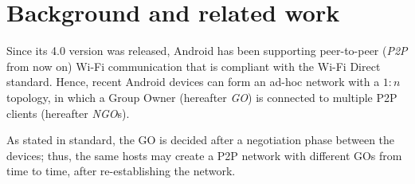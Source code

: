 \section{Background and related work} %
Since its 4.0 version was released, Android has been supporting peer-to-peer
(\textit{P2P} from now on) Wi-Fi communication that is compliant with the
Wi-Fi Direct standard\cite{bib:wifiP2pspec}.
Hence, recent Android devices can form an ad-hoc network with a $1:n$ topology,
in which a Group Owner (hereafter \textit{GO}) is connected to multiple P2P
clients (hereafter \textit{NGO}s).

As stated in standard, the GO is decided after a negotiation phase between the
devices; thus, the same hosts may create a P2P network with different GOs from
time to time, after re-establishing the network.
